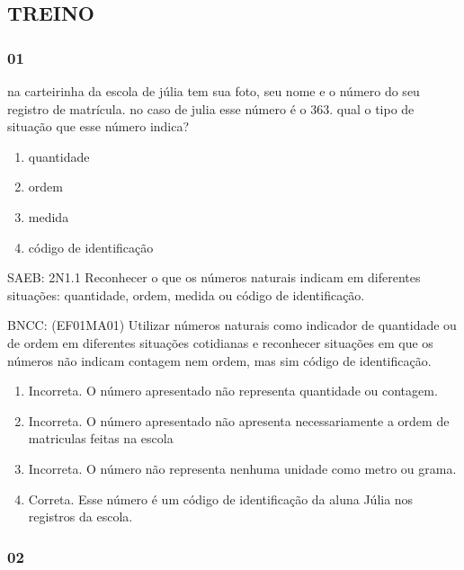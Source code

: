 \subsubsection{}\label{section-3}

\subsection{TREINO}\label{treino}

\subsubsection{01 }\label{section-4}

na carteirinha da escola de júlia tem sua foto, seu nome e o número do
seu registro de matrícula. no caso de julia esse número é o 363. qual o
tipo de situação que esse número indica?

\begin{enumerate}
\def\labelenumi{\Alph{enumi})}
\item
  quantidade
\item
  ordem
\item
  medida
\item
  código de identificação
\end{enumerate}

SAEB: 2N1.1 Reconhecer o que os números naturais indicam em diferentes
situações: quantidade, ordem, medida ou código de identificação.

BNCC: (EF01MA01) Utilizar números naturais como indicador de quantidade
ou de ordem em diferentes situações cotidianas e reconhecer situações em
que os números não indicam contagem nem ordem, mas sim código de
identificação.

\begin{enumerate}
\def\labelenumi{\alph{enumi})}
\item
  Incorreta. O número apresentado não representa quantidade ou contagem.
\item
  Incorreta. O número apresentado não apresenta necessariamente a ordem
  de matriculas feitas na escola
\item
  Incorreta. O número não representa nenhuma unidade como metro ou
  grama.
\item
  Correta. Esse número é um código de identificação da aluna Júlia nos
  registros da escola.
\end{enumerate}

\subsubsection{02 }\label{section-5}

